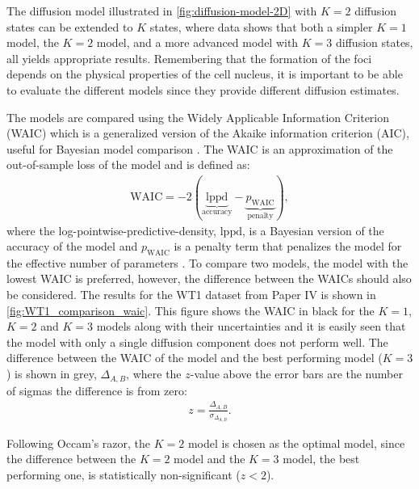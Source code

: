 The diffusion model illustrated in \autoref{fig:diffusion-model-2D} with $K=2$ diffusion states can be extended to $K$ states, where data shows that both a simpler $K=1$ model, the $K=2$ model, and a more advanced model with $K=3$ diffusion states, all yields appropriate results. Remembering that the formation of the foci depends on the physical properties of the cell nucleus, it is important to be able to evaluate the different models since they provide different diffusion estimates.

The models are compared using the Widely Applicable Information Criterion (WAIC) \parencite{watanabeAsymptoticEquivalenceBayes2010a} which is a generalized version of the Akaike information criterion (AIC), useful for Bayesian model comparison \parencite{gelmanUnderstandingPredictiveInformation2014a}. The WAIC is an approximation of the out-of-sample loss of the model and is defined as:
\begin{align}
    \mathrm{WAIC} = -2(\underbrace{\mathrm{lppd}}_\textrm{accuracy} - \underbrace{p_\mathrm{WAIC}}_\textrm{penalty}),
\end{align}
where the log-pointwise-predictive-density, $\mathrm{lppd}$, is a Bayesian version of the accuracy of the model and $p_\mathrm{WAIC}$ is a penalty term that penalizes the model for the effective number of parameters \parencite{mcelreathStatisticalRethinkingBayesian2020}. To compare two models, the model with the lowest WAIC is preferred, however, the difference between the WAICs should also be considered. The results for the WT1 dataset from Paper IV is shown in \autoref{fig:WT1_comparison_waic}. This figure shows the WAIC in black for the $K=1$, $K=2$ and $K=3$ models along with their uncertainties and it is easily seen that the model with only a single diffusion component does not perform well. The difference between the WAIC of the model and the best performing model ($K=3$) is shown in grey, $\Delta_{A,B}$, where the $z$-value above the error bars are the number of sigmas the difference is from zero:
\begin{align}
    z = \frac{\Delta_{A,B}}{\sigma_{\Delta_{A,B}}}.
\end{align}

Following Occam's razor, the $K=2$ model is chosen as the optimal model, since the difference between the $K=2$ model and the $K=3$ model, the best performing one, is statistically non-significant ($z<2$).


